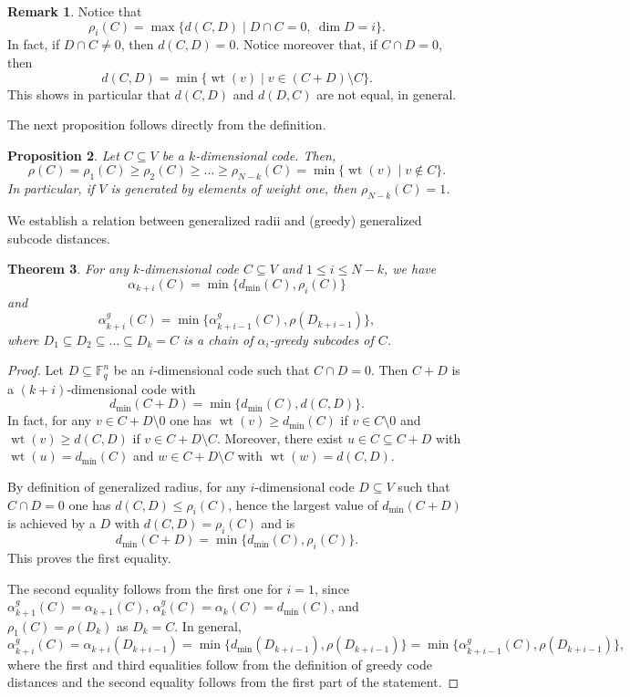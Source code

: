 \documentclass[12pt]{amsart}
\numberwithin{equation}{section}
\DeclareMathOperator{\wt}{wt}
\newtheorem{theorem}{Theorem}[section]
\newtheorem{proposition}[theorem]{Proposition}
\theoremstyle{definition}
\newtheorem{remark}[theorem]{Remark}
\newcommand{\FF}{\mathbb{F}}
\begin{document}
\begin{remark}
Notice that $$\rho_i(C)=\max\{d(C,D)\mid D\cap C=0,\ \dim D=i\}.$$ In fact, if $D\cap C\neq 0$, then $d(C,D)=0$. Notice moreover that, if $C\cap D=0$, then $$d(C,D)=\min\{\wt(v)\mid v\in (C+D)\setminus C\}.$$ This shows in particular that $d(C,D)$ and $d(D,C)$ are not equal, in general.
\end{remark}

The next proposition follows directly from the definition.

\begin{proposition}
Let $C\subseteq V$ be a $k$-dimensional code. Then,
$$\rho(C)=\rho_1(C)\geq\rho_2(C)\geq\ldots\geq\rho_{N-k}(C)=\min\{\wt(v)\mid v\not\in C\}.$$
In particular, if $V$ is generated by elements of weight one, then $\rho_{N-k}(C)=1$.
\end{proposition}

We establish a relation between generalized radii and (greedy) generalized subcode distances. 

\begin{theorem}\label{thm:radii}
For any $k$-dimensional code $C\subseteq V$ and $1\leq i\leq N-k$, we have
$$\alpha_{k+i}(C)=\min\{d_{\min}(C),\rho_i(C)\}$$ and $$\alpha_{k+i}^g(C)=\min\{\alpha^g_{k+i-1}(C),\rho(D_{k+i-1})\},$$ where $D_1\subseteq D_2\subseteq\ldots\subseteq D_k=C$ is a chain of $\alpha_i$-greedy subcodes of $C$.
\end{theorem}

\begin{proof}
Let $D\subseteq\FF_q^n$ be an $i$-dimensional code such that $C\cap D=0$. Then $C+D$ is a $(k+i)$-dimensional code with $$d_{\min}(C+D)=\min\{d_{\min}(C),d(C,D)\}.$$ In fact, for any $v\in C+D\setminus 0$ one has $\wt(v)\geq d_{\min}(C)$ if $v\in C\setminus 0$ and $\wt(v)\geq d(C,D)$ if $v\in C+D\setminus C$. Moreover, there exist $u\in C\subseteq C+D$ with $\wt(u)=d_{\min}(C)$ and $w\in C+D\setminus C$ with $\wt(w)=d(C,D)$. 

By definition of generalized radius, for any $i$-dimensional code $D\subseteq V$ such that $C\cap D=0$ one has $d(C,D)\leq\rho_i(C)$, hence the largest value of $d_{\min}(C+D)$ is achieved by a $D$ with $d(C,D)=\rho_i(C)$ and is $$d_{\min}(C+D)=\min\{d_{\min}(C),\rho_i(C)\}.$$ This proves the first equality.

The second equality follows from the first one for $i=1$, since $\alpha_{k+1}^g(C)=\alpha_{k+1}(C)$, $\alpha_{k}^g(C)=\alpha_{k}(C)=d_{\min}(C)$, and $\rho_1(C)=\rho(D_k)$ as $D_k=C$. In general, $$\alpha_{k+i}^g(C)=\alpha_{k+i}(D_{k+i-1})=\min\{d_{\min}(D_{k+i-1}),\rho(D_{k+i-1})\}
=\min\{\alpha^g_{k+i-1}(C),\rho(D_{k+i-1})\},$$
where the first and third equalities follow from the definition of greedy code distances and the second equality follows from the first part of the statement.   
\end{proof}
\end{document}

